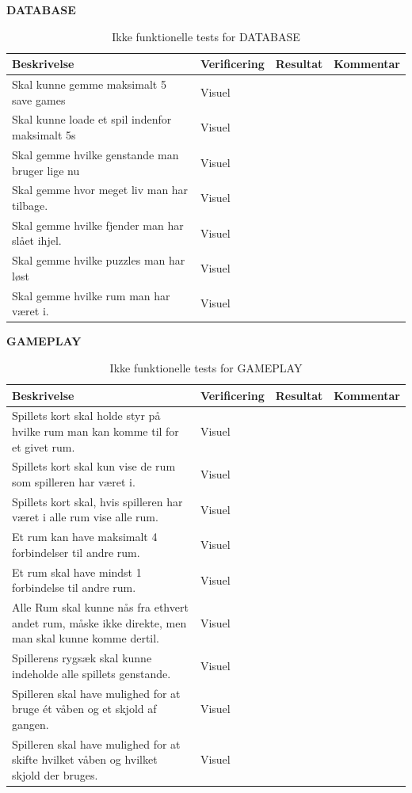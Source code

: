 \textbf{DATABASE}\\
\begin{table}[H]
\caption{ Ikke funktionelle tests for DATABASE}
\label{tab:}
\begin{tabular}{|p{3cm}|p{3cm}|p{3cm}|p{3cm}|}
\hline
Beskrivelse & Verificering & Resultat & Kommentar \\
\hline
Skal kunne gemme maksimalt 5 save games & Visuel & & \\
\hline
Skal kunne loade et spil indenfor maksimalt 5s & Visuel & &\\
\hline
Skal gemme hvilke genstande man bruger lige nu & Visuel & & \\
\hline
Skal gemme hvor meget liv man har tilbage. & Visuel & & \\
\hline
Skal gemme hvilke fjender man har slået ihjel. & Visuel & & \\
\hline
Skal gemme hvilke puzzles man har løst & Visuel & & \\
\hline
Skal gemme hvilke rum man har været i. & Visuel & & \\
\hline
\end{tabular}
\end{table}

\textbf{GAMEPLAY}\\
\begin{table}[H]
\caption{ Ikke funktionelle tests for GAMEPLAY}
\label{tab:}
\begin{tabular}{|p{3cm}|p{3cm}|p{3cm}|p{3cm}|}
\hline
Beskrivelse & Verificering & Resultat & Kommentar \\
\hline
Spillets kort skal holde styr på hvilke rum man kan komme til for et givet rum. & Visuel & & \\
\hline
Spillets kort skal kun vise de rum som spilleren har været i. & Visuel & &\\
\hline
Spillets kort skal, hvis spilleren har været i alle rum vise alle rum. & Visuel & & \\
\hline
Et rum kan have maksimalt 4 forbindelser til andre rum. & Visuel & & \\
\hline
Et rum skal have mindst 1 forbindelse til andre rum. & Visuel & & \\
\hline
Alle Rum skal kunne nås fra ethvert andet rum, måske ikke direkte, men man skal kunne komme dertil. & Visuel & & \\
\hline
Spillerens rygsæk skal kunne indeholde alle spillets genstande. & Visuel & & \\
\hline
Spilleren skal have mulighed for at bruge ét våben og et skjold af gangen. & Visuel & & \\
\hline
Spilleren skal have mulighed for at skifte hvilket våben og hvilket skjold der bruges. & Visuel & & \\
\hline
\end{tabular}
\end{table}


